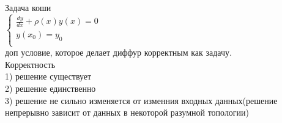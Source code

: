 \documentclass[a4paper]{article}
\begin{document}
    












    \newpage
    Задача коши\\
    $\begin{cases}
        \frac{dy}{dx}+\rho(x)y(x)=0\\
        y(x_0)=y_0\\
    \end{cases}$\\
    доп условие, которое делает диффур корректным как задачу.\\
    Корректность\\
    1) решение существует\\
    2) решение единственно\\
    3) решение не сильно изменяется от изменния входных данных(решение непрерывно зависит от данных в некоторой разумной топологии)\\\\
\end{document}
